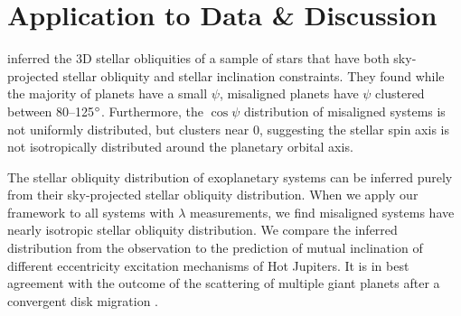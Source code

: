 \documentclass[twocolumn,times]{aastex631}
\begin{document}
\section{Application to Data \& Discussion}\label{sec:data}

\cite{Albrecht21} inferred the 3D stellar obliquities of a sample of stars that have both sky-projected stellar obliquity and stellar inclination constraints. They found while the majority of planets have a small $\psi$, misaligned planets have $\psi$ clustered between 80--125$\mbox{$^\circ$}$. Furthermore, the $\cos{\psi}$ distribution of misaligned systems is not uniformly distributed, but clusters near 0, suggesting the stellar spin axis is not isotropically distributed around the planetary orbital axis.

The stellar obliquity distribution of exoplanetary systems can be inferred purely from their sky-projected stellar obliquity distribution. When we apply our framework to all systems with $\lambda$ measurements, we find misaligned systems have nearly isotropic stellar obliquity distribution. We compare the inferred distribution from the observation to the prediction of mutual inclination of different eccentricity excitation mechanisms of Hot Jupiters. It is in best agreement with the outcome of the scattering of multiple giant planets after a convergent disk migration \citep{Beague12}.


\end{document}
